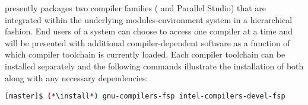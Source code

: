 \FSP{} presently packages two compiler families ({\GNU{}} and {\Intel{}
  Parallel Studio}) that are integrated within the underlying
modules-environment system in a hierarchical fashion. End users of a \FSP{}
system can choose to access one compiler at a time and will be presented with
additional compiler-dependent software as a function of which compiler
toolchain is currently loaded. Each compiler toolchain can be installed
separately and the following commands illustrate the installation of both along
with any necessary dependencies:

\begin{lstlisting}[language=bash]
[master]$ (*\install*) gnu-compilers-fsp intel-compilers-devel-fsp
\end{lstlisting}
